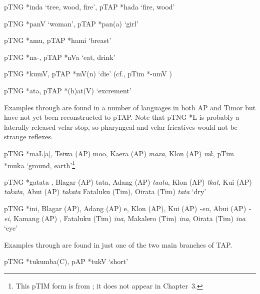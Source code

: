 \ea%
\label{ex:4:35}
\upshape   pTNG *inda `tree, wood, fire', pTAP *hada `fire, wood'  
\z

\ea%
\label{ex:4:36}
\upshape   pTNG *panV `woman', pTAP *pan(a) `girl'  
\z

\ea%
\label{ex:4:37}
\upshape pTNG *amu, pTAP *hami `breast'  
\z

\ea%
\label{ex:4:38}
\upshape   pTNG *na-, pTAP *nVa `eat, drink'  
\z

\ea%
\label{ex:4:39}
\upshape   pTNG *kumV, pTAP *mV(n) `die' (cf., pTim *-umV )  
\z

\ea%
\label{ex:4:40}
\upshape   pTNG *ata, pTAP *(h)at(V) `excrement'  
\z

Examples  through  are found in a number of languages in both AP and Timor but have not yet been reconstructed to pTAP. Note that pTNG *L is probably a laterally released velar stop, so pharyngeal and velar fricatives would not be strange reflexes.

\ea%
\label{ex:4:41}
\upshape   pTNG *maL[a], 
Teiwa (AP) mo{\pharfric}o{\textglotstop}, 
Kaera (AP) \textit{maxa}, 
Klon (AP) \textit{m{\textschwa}k{\textepsilon}{\textglotstop}}, 
pTim *muka `ground, earth'\footnote{This pTIM form is from \citet{SchapperEtAl2012historical}; it does not appear in Chapter~3.}  
\z

\ea%
\label{ex:4:42}
\upshape    pTNG *gatata , Blagar (AP) tata, Adang (AP) \textit{ta}\textit{{\textglotstop}}\textit{ata}, Klon (AP) \textit{t}\textit{{\textschwa}}\textit{kat}, Kui (AP) \textit{takata}, Abui (AP) \textit{takata} Fataluku (Tim), Oirata (Tim) \textit{tata} `dry'  
\z

\ea%
\label{ex:4:43}
\upshape  pTNG *ini, Blagar (AP), Adang (AP) e{\ng}, Klon (AP), Kui (AP) \textit{-en}, Abui (AP) \textit{-ei{\ng}}, Kamang (AP) \textit{{\ng}}, Fataluku (Tim) \textit{ina}, Makalero (Tim) \textit{ina}, Oirata (Tim) \textit{ina} `eye' 
   \z

Examples  through  are found in just one of the two main branches of TAP.

\ea%
\label{ex:4:44}
\upshape    pTNG *tukumba(C), pAP *tukV `short'  
\z

